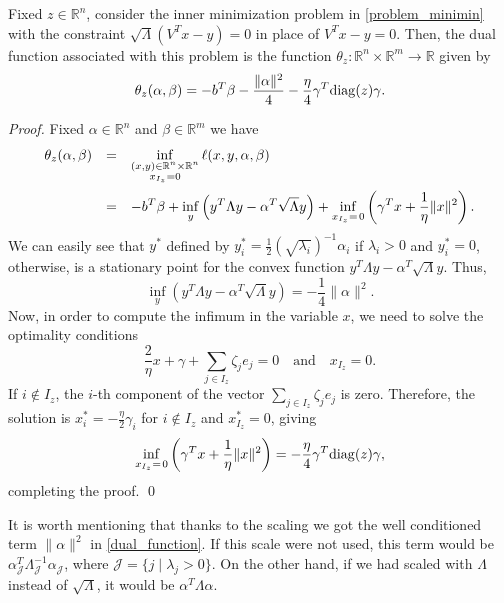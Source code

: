 \documentclass[smallextended,referee,envcountsect]{svjour3}
\newcommand{\R}{\mathbb{R}}
\begin{document}
\begin{lemma}
\label{lm:dual_fc}
Fixed $z\in\R^n$, consider the inner minimization problem in \eqref{problem_minimin} 
with the constraint $\sqrt{\Lambda}(V^Tx-y) = 0$ in place of $V^Tx-y = 0$. Then, the 
dual function associated with this problem is the function $\theta_z:\R^n\times\R^m\to\R$ 
given by 
\begin{equation}
\label{dual_function}
\theta_z(\alpha,\beta) = -b^T\beta - \dfrac{\|\alpha\|^2}{4} - 
\dfrac{\eta}{4}\gamma^T{\rm diag}(z)\gamma.
\end{equation}
\end{lemma}
\begin{proof}
Fixed $\alpha\in\R^n$ and $\beta\in\R^m$ we have 
$$
\begin{array}{ccl}
\theta_z(\alpha,\beta) & = & \displaystyle
\inf_{\substack{(x,y)\in\R^n\times\R^n \\ x_{I_z}=0}}\ell(x,y,\alpha,\beta) \vspace{5pt} \\ 
& = & \displaystyle
-b^T\beta+\inf_{y}\left(y^T\Lambda{y}-\alpha^T\sqrt{\Lambda}y\right)+
\inf_{x_{I_z}=\hspace{1pt}0}\left(\gamma^Tx+\frac{1}{\eta}\|x\|^2\right).
\end{array}
$$
We can easily see that $y^*$ defined by 
$y_i^*=\frac{1}{2}(\sqrt{\lambda_i})^{-1}\alpha_i$ if $\lambda_i>0$ and $y_i^*=0$, 
otherwise, is a stationary point for the convex function 
$y^T\Lambda{y}-\alpha^T\sqrt{\Lambda}y$. Thus, 
$$
\inf_{y}\left(y^T\Lambda{y}-\alpha^T\sqrt{\Lambda}y\right)=-\dfrac{1}{4}\|\alpha\|^2.
$$
Now, in order to compute the infimum in the variable $x$, we need to solve the optimality 
conditions 
$$
\frac{2}{\eta}x+\gamma+\sum\limits_{j\in I_z}\zeta_je_j = 0\quad\mbox{and}\quad x_{I_z}=0.
$$
If $i\notin I_z$, the $i$-th component of the vector $\sum\limits_{j\in I_z}\zeta_je_j$ 
is zero. Therefore, the solution is 
$x_i^*=-\frac{\eta}{2}\gamma_i$ for $i\notin I_z$ and $x_{I_z}^*=0$, giving 
$$
\inf_{x_{I_z}=\hspace{1pt}0}\left(\gamma^Tx+\frac{1}{\eta}\|x\|^2\right) = 
-\dfrac{\eta}{4}\gamma^T{\rm diag}(z)\gamma,
$$
completing the proof.
\qed\end{proof}

It is worth mentioning that thanks to the scaling we got the well conditioned term 
$\|\alpha\|^2$ in \eqref{dual_function}. If this scale were not used, this term would be 
$\alpha_\mathcal{J}^T\Lambda_\mathcal{J}^{-1}\alpha_\mathcal{J}$, where 
$\mathcal{J}=\{j\mid\lambda_j>0\}$. On the other hand, if we had scaled with $\Lambda$ 
instead of $\sqrt{\Lambda}$, it would be $\alpha^T\Lambda\alpha$.
\end{document}
